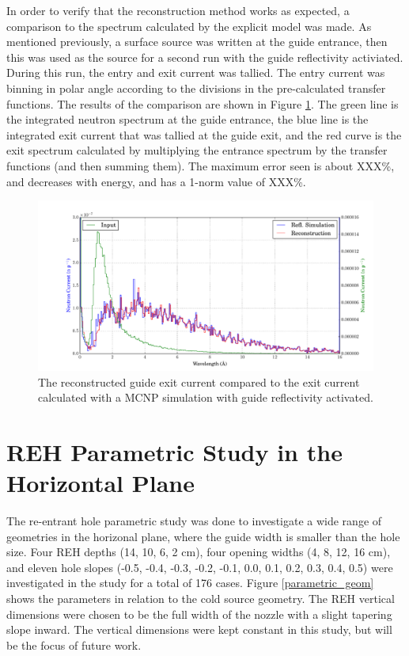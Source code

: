 \documentclass[a4paper]{jpconf}
\begin{document}
In order to verify that the reconstruction method works as expected, a comparison to the spectrum calculated by the explicit model was made.  As mentioned previously, a surface source was written at the guide entrance, then this was used as the source for a second run with the guide reflectivity activiated.  During this run, the entry and exit current was tallied.  The entry current was binning in polar angle according to the divisions in the pre-calculated transfer functions.  The results of the comparison are shown in Figure \ref{xfer_bench}.  The green line is the integrated neutron spectrum at the guide entrance, the blue line is the integrated exit current that was tallied at the guide exit, and the red curve is the exit spectrum calculated by multiplying the entrance spectrum by the transfer functions (and then summing them).  The maximum error seen is about XXX\%, and decreases with energy, and has a 1-norm value of XXX\%.

\begin{figure}
\begin{center}
\includegraphics[scale=0.4]{graphics/xfer_bench.pdf}
\end{center}
\caption{\label{xfer_bench}The reconstructed guide exit current compared to the exit current calculated with a MCNP simulation with guide reflectivity activated.}
\end{figure}

\section{REH Parametric Study in the Horizontal Plane}

The re-entrant hole parametric study was done to investigate a wide range of geometries in the horizonal plane, where the guide width is smaller than the hole size.  Four REH depths (14, 10, 6, 2 cm), four opening widths (4, 8, 12, 16 cm), and eleven hole slopes (-0.5, -0.4, -0.3, -0.2, -0.1, 0.0, 0.1, 0.2, 0.3, 0.4, 0.5) were investigated in the study for a total of 176 cases. Figure \ref{parametric_geom} shows the parameters in relation to the cold source geometry.  The REH vertical dimensions were chosen to be the full width of the nozzle with a slight tapering slope inward.  The vertical dimensions were kept constant in this study, but will be the focus of future work.
\end{document}
